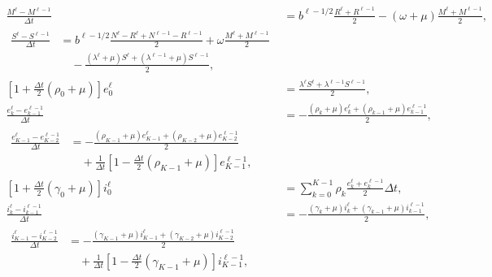 \documentclass[USenglish]{article}
\begin{document}
\begin{subequations}
  \label{numerics_time_since_entry_structured}
  \begin{align}
    \frac{M^{\ell} - M^{\ell - 1}}{\Delta t} &=
    b^{\ell - 1 / 2} \frac{R^{\ell} + R^{\ell - 1}}{2}
    - (\omega + \mu) \frac{M^{\ell} + M^{\ell - 1}}{2},
    \\
    \begin{split}
      \frac{S^{\ell} - S^{\ell - 1}}{\Delta t} &=
      b^{\ell - 1 / 2}
      \frac{N^{\ell} - R^{\ell} + N^{\ell - 1} - R^{\ell - 1}}{2}
      + \omega \frac{M^{\ell} + M^{\ell - 1}}{2}
      \\ & \quad {}
      - \frac{(\lambda^{\ell} + \mu) S^{\ell}
        + (\lambda^{\ell - 1} + \mu) S^{\ell - 1}}{2},
    \end{split}
    \\
    \left[1 + \frac{\Delta t}{2} (\rho_0 + \mu)\right] e_0^{\ell}
    &= \frac{\lambda^{\ell} S^{\ell} + \lambda^{\ell - 1} S^{\ell - 1}}{2},
    \\
    \frac{e_k^{\ell} - e_{k - 1}^{\ell - 1}}{\Delta t} &=
    - \frac{(\rho_k + \mu) e_k^{\ell}
      + (\rho_{k - 1} + \mu) e_{k - 1}^{\ell - 1}}{2},
    \\
    \begin{split}
      \frac{e_{K - 1}^{\ell} - e_{K - 2}^{\ell - 1}}{\Delta t} &=
      - \frac{(\rho_{K - 1} + \mu) e_{K - 1}^{\ell}
        + (\rho_{K - 2} + \mu) e_{K - 2}^{\ell - 1}}{2}
      \\ & \quad {}
      + \frac{1}{\Delta t} \left[
        1 - \frac{\Delta t}{2} (\rho_{K - 1} + \mu)
      \right] e_{K - 1}^{\ell - 1},
    \end{split}
    \\
    \left[1 + \frac{\Delta t}{2} (\gamma_0 + \mu)\right] i_0^{\ell}
    &= \sum_{k = 0}^{K - 1} \rho_k
    \frac{e_k^{\ell} + e_k^{\ell - 1}}{2}
    \Delta t,
    \\
    \frac{i_k^{\ell} - i_{k - 1}^{\ell - 1}}{\Delta t} &=
    - \frac{(\gamma_k + \mu) i_k^{\ell}
      + (\gamma_{k - 1} + \mu) i_{k - 1}^{\ell - 1}}{2},
    \\
    \begin{split}
      \frac{i_{K - 1}^{\ell} - i_{K - 2}^{\ell - 1}}{\Delta t} &=
      - \frac{(\gamma_{K - 1} + \mu) i_{K - 1}^{\ell}
        + (\gamma_{K - 2} + \mu) i_{K - 2}^{\ell - 1}}{2}
      \\ & \quad {}
      + \frac{1}{\Delta t} \left[
        1 - \frac{\Delta t}{2} (\gamma_{K - 1} + \mu)
      \right] i_{K - 1}^{\ell - 1},

\end{split}
\end{align}
\end{subequations}
\end{document}
